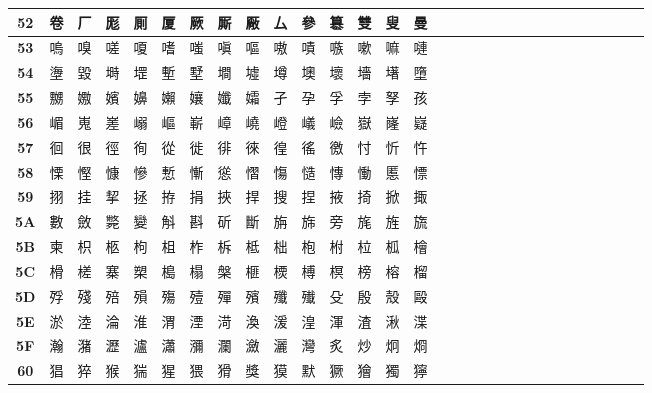 \begin{table}[H]
\begin{tabular}{|Sc|Sc|Sc|Sc|Sc|Sc|Sc|Sc|Sc|Sc|Sc|Sc|Sc|Sc|Sc|}
\textbf{52} & 卷 & 厂 & 厖 & 厠 & 厦 & 厥 & 厮 & 厰 & 厶 & 參 & 簒 & 雙 & 叟 & 曼 \\ \hline
\textbf{53} & 嗚 & 嗅 & 嗟 & 嗄 & 嗜 & 嗤 & 嗔 & 嘔 & 嗷 & 嘖 & 嗾 & 嗽 & 嘛 & 嗹 \\ \hline
\textbf{54} & 塰 & 毀 & 塒 & 堽 & 塹 & 墅 & 墹 & 墟 & 墫 & 墺 & 壞 & 墻 & 墸 & 墮 \\ \hline
\textbf{55} & 嬲 & 嫐 & 嬪 & 嬶 & 嬾 & 孃 & 孅 & 孀 & 孑 & 孕 & 孚 & 孛 & 孥 & 孩 \\ \hline
\textbf{56} & 嵋 & 嵬 & 嵳 & 嵶 & 嶇 & 嶄 & 嶂 & 嶢 & 嶝 & 嶬 & 嶮 & 嶽 & 嶐 & 嶷 \\ \hline
\textbf{57} & 徊 & 很 & 徑 & 徇 & 從 & 徙 & 徘 & 徠 & 徨 & 徭 & 徼 & 忖 & 忻 & 忤 \\ \hline
\textbf{58} & 慄 & 慳 & 慷 & 慘 & 慙 & 慚 & 慫 & 慴 & 慯 & 慥 & 慱 & 慟 & 慝 & 慓 \\ \hline
\textbf{59} & 挧 & 挂 & 挈 & 拯 & 拵 & 捐 & 挾 & 捍 & 搜 & 捏 & 掖 & 掎 & 掀 & 掫 \\ \hline
\textbf{5A} & 數 & 斂 & 斃 & 變 & 斛 & 斟 & 斫 & 斷 & 旃 & 旆 & 旁 & 旄 & 旌 & 旒 \\ \hline
\textbf{5B} & 柬 & 枳 & 柩 & 枸 & 柤 & 柞 & 柝 & 柢 & 柮 & 枹 & 柎 & 柆 & 柧 & 檜 \\ \hline
\textbf{5C} & 榾 & 槎 & 寨 & 槊 & 槝 & 榻 & 槃 & 榧 & 樮 & 榑 & 榠 & 榜 & 榕 & 榴 \\ \hline
\textbf{5D} & 殍 & 殘 & 殕 & 殞 & 殤 & 殪 & 殫 & 殯 & 殲 & 殱 & 殳 & 殷 & 殼 & 毆 \\ \hline
\textbf{5E} & 淤 & 淕 & 淪 & 淮 & 渭 & 湮 & 渮 & 渙 & 湲 & 湟 & 渾 & 渣 & 湫 & 渫 \\ \hline
\textbf{5F} & 瀚 & 潴 & 瀝 & 瀘 & 瀟 & 瀰 & 瀾 & 瀲 & 灑 & 灣 & 炙 & 炒 & 炯 & 烱 \\ \hline
\textbf{60} & 猖 & 猝 & 猴 & 猯 & 猩 & 猥 & 猾 & 獎 & 獏 & 默 & 獗 & 獪 & 獨 & 獰 \\ \hline
\end{tabular}
\end{table}

